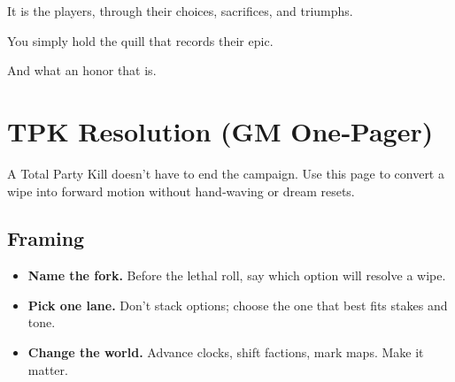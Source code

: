 It is the players, through their choices, sacrifices, and triumphs.

You simply hold the quill that records their epic.

And what an honor that is.


\clearpage

\section{TPK Resolution (GM One‑Pager)}\label{sec:tpk-onepager}

A Total Party Kill doesn’t have to end the campaign. Use this page to convert a wipe into forward motion without hand‑waving or dream resets.

\subsection*{Framing}
\begin{itemize}
\item \textbf{Name the fork.} Before the lethal roll, say which option will resolve a wipe.
\item \textbf{Pick one lane.} Don’t stack options; choose the one that best fits stakes and tone.
\item \textbf{Change the world.} Advance clocks, shift factions, mark maps. Make it matter.
\end{itemize}

